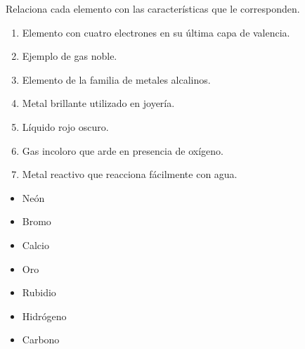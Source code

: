 \documentclass[11pt]{book}
\begin{document}
\begin{boxK}
  Relaciona cada elemento con las características que le corresponden.

  \begin{minipage}{0.6\textwidth}
    \begin{enumerate}\footnotesize
      \item Elemento con cuatro electrones en su última capa de valencia.
      \item Ejemplo de gas noble.
      \item Elemento de la familia de metales alcalinos.
      \item Metal brillante utilizado en joyería.
      \item Líquido rojo oscuro.
      \item Gas incoloro que arde en presencia de oxígeno.
      \item Metal reactivo que reacciona fácilmente con agua.
    \end{enumerate}
  \end{minipage}\hfill
  \begin{minipage}{0.25\textwidth}
    \begin{itemize}
      \item[\rule{1cm}{0.2mm}] Neón
      \item[\rule{1cm}{0.2mm}] Bromo
      \item[\rule{1cm}{0.2mm}] Calcio
      \item[\rule{1cm}{0.2mm}] Oro
      \item[\rule{1cm}{0.2mm}] Rubidio
      \item[\rule{1cm}{0.2mm}] Hidrógeno
      \item[\rule{1cm}{0.2mm}] Carbono
    \end{itemize}
  \end{minipage}
\end{boxK}



\end{document}
